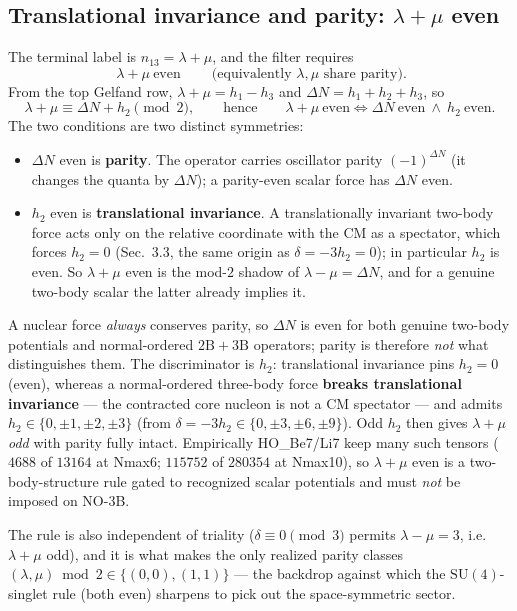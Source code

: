 \documentclass[11pt]{article}
\newcommand{\shift}{\ensuremath{\Delta N}}
\newcommand{\diff}{\ensuremath{\delta}}
\newcommand{\lm}{\ensuremath{\lambda}}
\newcommand{\mumu}{\ensuremath{\mu}}
\begin{document}
\subsection{Translational invariance and parity: $\lm+\mumu$ even}
The terminal label is $n_{13}=\lm+\mumu$, and the filter requires
\[
\boxed{\ \lm+\mumu \ \text{even}\ } \qquad\text{(equivalently } \lm,\mumu \text{ share parity).}
\]
From the top Gelfand row, $\lm+\mumu=h_1-h_3$ and $\shift=h_1+h_2+h_3$, so
\[
\lm+\mumu \equiv \shift + h_2 \pmod 2,
\qquad\text{hence}\qquad
\lm+\mumu\ \text{even}\iff \shift\ \text{even}\ \wedge\ h_2\ \text{even}.
\]
The two conditions are two distinct symmetries:
\begin{itemize}
\item $\shift$ even is \textbf{parity}. The operator carries oscillator parity
$(-1)^{\shift}$ (it changes the quanta by $\shift$); a parity-even scalar force
has $\shift$ even.
\item $h_2$ even is \textbf{translational invariance}. A translationally
invariant two-body force acts only on the relative coordinate with the CM as a
spectator, which forces $h_2=0$ (Sec.~3.3, the same origin as $\diff=-3h_2=0$);
in particular $h_2$ is even. So $\lm+\mumu$ even is the mod-$2$ shadow of
$\lm-\mumu=\shift$, and for a genuine two-body scalar the latter already implies
it.
\end{itemize}
A nuclear force \emph{always} conserves parity, so $\shift$ is even for both
genuine two-body potentials and normal-ordered $2\mathrm B{+}3\mathrm B$
operators; parity is therefore \emph{not} what distinguishes them. The
discriminator is $h_2$: translational invariance pins $h_2=0$ (even), whereas a
normal-ordered three-body force \textbf{breaks translational invariance} --- the
contracted core nucleon is not a CM spectator --- and admits $h_2\in\{0,\pm1,
\pm2,\pm3\}$ (from $\diff=-3h_2\in\{0,\pm3,\pm6,\pm9\}$). Odd $h_2$ then gives
$\lm+\mumu$ \emph{odd} with parity fully intact. Empirically HO\_Be7/Li7 keep
many such tensors ($4688$ of $13164$ at Nmax6; $115752$ of $280354$ at Nmax10),
so $\lm+\mumu$ even is a two-body-structure rule gated to recognized scalar
potentials and must \emph{not} be imposed on NO-3B.

The rule is also independent of triality ($\diff\equiv0\pmod3$ permits
$\lm-\mumu=3$, i.e.\ $\lm+\mumu$ odd), and it is what makes the only realized
parity classes $(\lm,\mumu)\bmod2\in\{(0,0),(1,1)\}$ --- the backdrop against
which the $\mathrm{SU}(4)$-singlet rule (both even) sharpens to pick out the
space-symmetric sector.
\end{document}
